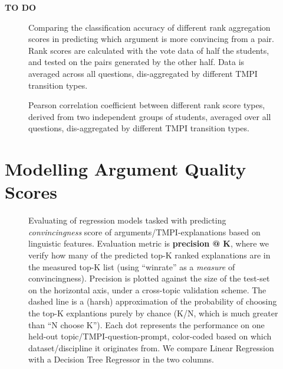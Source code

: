 \documentclass[notitlepage,12pt]{jedm}
\begin{document}
\textbf{TO DO}



\begin{figure}
	\scalebox{0.6}{}
	\caption{
		Comparing the classification accuracy of different rank aggregation 
		scores in predicting which argument is more convincing from a pair. 
		Rank scores are calculated with the vote data of half the students, and 
		tested on the pairs generated by the other half. 
		Data is averaged across all questions, dis-aggregated by different TMPI 
		transition types. 
	}
	\label{fig:acc_by_rank_score_type}
\end{figure}

\begin{figure}
	\scalebox{0.6}{}
	\caption{
		Pearson correlation coefficient between different rank score types, 
		derived from two independent groups of students, averaged over all 
		questions, dis-aggregated by different TMPI transition types.
	}
	\label{fig:acc_by_rank_score_type}
\end{figure}






\section{Modelling Argument Quality Scores}\label{sec:model}

\begin{figure}
	\scalebox{0.5}{}
	\caption{
		Evaluating of regression models tasked with predicting 
		\textit{convincingness} score of arguments/TMPI-explanations based on 
		linguistic features.
		Evaluation metric is \textbf{precision @ K}, where we verify how many 
		of the predicted top-K ranked explanations are in the measured top-K 
		list (using ``winrate'' as a \textit{measure} of convincingness). 
		Precision is plotted against the size of the test-set on the horizontal 
		axis, under a cross-topic validation scheme.
		The dashed line is a (harsh) approximation of the probability of 
		choosing the top-K explantions purely by chance (K/N, which is much 
		greater than ``N choose K'').
		Each dot represents the performance on one held-out 
		topic/TMPI-question-prompt, color-coded based on which 
		dataset/discipline it originates from.
		We compare Linear Regression with a Decision Tree Regressor in the two 
		columns.
	}
	\label{fig:prec_at_K}
\end{figure}
\end{document}
